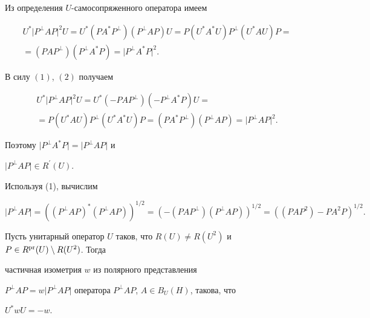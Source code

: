 \begin{pf}


Из определения $U$-самосопряженного оператора имеем


\begin{multline*}


U^{*}\vert P^{\perp}AP\vert^{2}U=U^{*}(PA^{*}P^{\perp})(P^{\perp}AP)U=


P(U^{*}A^{*}U)P^{\perp}(U^{*}AU)P= \\


%


=(PAP^{\perp})(P^{\perp}A^{*}P)=\vert P^{\perp}A^{*}P\vert^{2}.


\end{multline*}


В силу $(1)$, $(2)$ получаем


\begin{multline*}


U^{*}\vert P^{\perp}AP\vert^{2}U=U^{*}(-PAP^{\perp})(-P^{\perp}A^{*}P)U=\\


=P(U^{*}AU)P^{\perp}(U^{*}A^{*}U)P=(PA^{*}P^{\perp})(P^{\perp}AP)=\vert


P^{\perp}AP\vert^{2}.


\end{multline*}


Поэтому $\vert P^{\perp}A^{*}P\vert=\vert P^{\perp}AP\vert$ и


$\vert P^{\perp}AP\vert\in R^{\prime}(U)$.


\end{pf}





Используя (1), вычислим


$$


\vert P^{\perp}AP\vert


= ((P^{\perp}AP)^{*}(P^{\perp}AP))^{1/2}=


(-(PAP^{\perp})(P^{\perp}AP))^{1/2}=


((PAP^{2})-PA^{2}P)^{1/2}.


$$





\begin{prop}


Пусть унитарный оператор $U$ таков, что $R(U)\ne


R(U^{2})$ и $P\in R^{\pr}(U)\setminus R(U^{2})$. Тогда


частичная изометрия $w$ из полярного представления


$P^{\perp}AP=w\vert P^{\perp}


AP\vert$ оператора $P^{\perp} AP$, $A\in B_{U}(H)$, такова, что


$U^{*}wU=-w$.


\end{prop}





